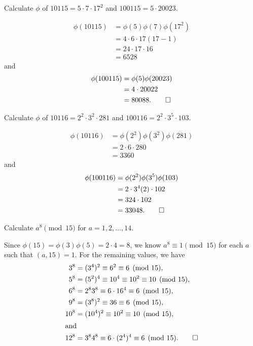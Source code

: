  Calculate $\phi$ of $10115 = 5\cdot7\cdot17^2$ and
$100115 = 5\cdot20023$.
\begin{solution}
  \begin{align*}
    \phi(10115) &= \phi(5)\phi(7)\phi(17^2) \\
                &= 4\cdot6\cdot17(17-1) \\
                &= 24\cdot17\cdot16 \\
                &= 6528
  \end{align*}
  and
  \begin{align*}
    \phi(100115) &= \phi(5)\phi(20023) \\
                 &= 4\cdot20022 \\
                 &= 80088. \qedhere
  \end{align*}
\end{solution}

 Calculate $\phi$ of $10116 = 2^2\cdot3^2\cdot281$ and
$100116 = 2^2\cdot3^5\cdot103$.
\begin{solution}
  \begin{align*}
    \phi(10116) &= \phi(2^2)\phi(3^2)\phi(281) \\
                &= 2\cdot6\cdot280 \\
                &= 3360
  \end{align*}
  and
  \begin{align*}
    \phi(100116) &= \phi(2^2)\phi(3^5)\phi(103) \\
                 &= 2\cdot3^4(2)\cdot102 \\
                 &= 324\cdot102 \\
                 &= 33048. \qedhere
  \end{align*}
\end{solution}

 Calculate $a^8\pmod{15}$ for $a = 1,2,\dots,14$.
\begin{solution}
  Since $\phi(15) = \phi(3)\phi(5) = 2\cdot4 = 8$, we know
  $a^8\equiv1\pmod{15}$ for each $a$ such that $(a,15) = 1$. For the
  remaining values, we have
  \begin{align*}
    3^8 &= (3^4)^2 \equiv 6^2 \equiv 6\pmod{15}, \\
    5^8 &= (5^2)^4 \equiv 10^4 \equiv 10^2 \equiv 10\pmod{15}, \\
    6^8 &= 2^83^8 \equiv 6\cdot16^4 \equiv 6\pmod{15}, \\
    9^8 &= (3^8)^2 \equiv 36 \equiv 6 \pmod{15}, \\
    10^8 &= (10^4)^2 \equiv 10^2 \equiv 10\pmod{15}, \\
    \intertext{and}
    12^8 &= 3^84^8 \equiv 6\cdot(2^4)^4 \equiv 6\pmod{15}. \qedhere
  \end{align*}
\end{solution}

